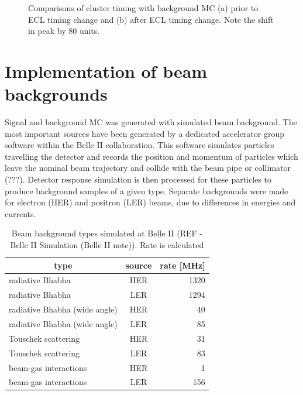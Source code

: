 \documentclass[12pt]{thesis}  %
\begin{document}
\begin{figure}[h]
\begin{subfigure}[b]{0.475\textwidth}
            \caption[]%
            {{\small}}    
            \label{fig:mean and std of net24}
        \end{subfigure}
        \caption{Comparisons of cluster timing with background MC (a) prior to ECL timing change and (b) after ECL timing change. Note the shift in peak by 80 units.}
    \end{figure}



\section{Implementation of beam backgrounds}

Signal and background MC was generated with simulated beam background. The most important sources have been generated by a dedicated accelerator group software within the Belle II collaboration. This software simulates particles travelling the detector and records the position and momentum of particles which leave the nominal beam trajectory and collide with the beam pipe or collimator (???). Detector response simulation is then processed for these particles to produce background samples of a given type. Separate backgrounds were made for electron (HER) and positron (LER) beams, due to differences in energies and currents. 

\begin{table}[h]
\centering
\begin{tabular}{lcr}
\hline
\multicolumn{1}{c}{type}      & source & \multicolumn{1}{c}{rate [MHz]} \\ \hline
radiative Bhabha              & HER    & \num{1320}                     \\
radiative Bhabha              & LER    & \num{1294}                     \\
radiative Bhabha (wide angle) & HER    & \num{40}                       \\
radiative Bhabha (wide angle) & LER    & \num{85}                       \\
Touschek scattering           & HER    & \num{31}                       \\
Touschek scattering           & LER    & \num{83}                       \\
beam-gas interactions         & HER    & \num{1}                        \\
beam-gas interactions         & LER    & \num{156}                      \\ \hline
\end{tabular}
\caption{Beam background types simulated at Belle II (REF - Belle II Simulation (Belle II note)). Rate is calculated}
\label{my-label}
\end{table}
\end{document}
